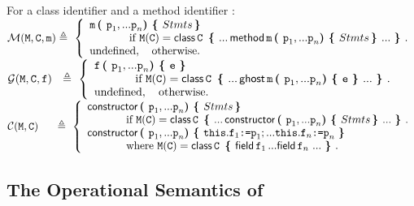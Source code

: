  \begin{definition}[Lookup] For a class identifier   and a method identifier $:$  $ ~ $ \\
\label{def:lookup}
\noindent
$
{\mathcal M}({\mbox{\tt{\ensuremath{{\mbox{\tt{M}}}}}}}{},{\mbox{\tt{{\mbox{\tt{C}}}}}}, {\mbox{\tt{m}}})       \triangleq  \ \left\{
\begin{array}{l}
                        {\mbox{\tt{m}}}\, {\mbox{\tt{\mbox{\tt{\bf{( }}}}}} {\mbox{\tt{p}}}_1, ... {\mbox{\tt{p}}}_n {\mbox{\tt{\mbox{\tt{\bf{) }}}}}} {\mbox{\tt{\mbox{\tt{\bf{\{ }}}}}} Stmts\, {\mbox{\tt{\mbox{\tt{\bf{\} }}}}}}\\
\hspace{0.5in} \mbox{if}\  {\mbox{\tt{\ensuremath{{\mbox{\tt{M}}}}}}}({\mbox{\tt{C}}}) =   {\bf{\sf {class}}}\, {\mbox{\tt{C}}}\, \  {\mbox{\tt{\mbox{\tt{\bf{\{ }}}}}} ...\,   {\bf{\sf {method}}}\, {\mbox{\tt{m}}}\, {\mbox{\tt{\mbox{\tt{\bf{( }}}}}} {\mbox{\tt{p}}}_1, ... {\mbox{\tt{p}}}_n {\mbox{\tt{\mbox{\tt{\bf{) }}}}}} {\mbox{\tt{\mbox{\tt{\bf{\{ }}}}}} Stmts\,  {\mbox{\tt{\mbox{\tt{\bf{\} }}}}}}  ... \ {\mbox{\tt{\mbox{\tt{\bf{\} }}}}}}.
\\
\mbox{undefined},  \ \ \ \mbox{otherwise.}
\end{array}
                    \right.$
\\
$
{\mathcal G} (\M, {\prg{C}}, {\f})    \ \   \triangleq  \ \left\{
\begin{array}{l}
                        \f\, \lp \p_1, ... \p_n \rp \lb \prg{e}\  \rb\\
\hspace{0.5in} \mbox{if}\  \M(\prg{C}) =   \kwN{class}\, \prg{C}\, \  \lb ...\,   \kwN{ghost}\,  \m\, \lp \p_1, ... \p_n \rp \lb \prg{e} \  \rb  ... \ \rb.
\\
\mbox{undefined},  \ \ \ \mbox{otherwise.}
\end{array}
                    \right.$
\\
$
{\mathcal C} (\M, {\prg{C}})   \quad \ \,   \triangleq  \ \left\{
\begin{array}{l}
                        \kwN{constructor} \, \lp \p_1, ... \p_n \rp \lb Stmts\, \rb\\
\hspace{0.5in} \mbox{if}\  \M(\prg{C}) =   \kwN{class}\, \prg{C}\, \  \lb ... \, \kwN{constructor} \, \lp \p_1, ... \p_n \rp \lb Stmts\, \rb ... \ \rb.
\\
\kwN{constructor} \, \lp \p_1, ... \p_n \rp \lb \prg{this}.\f_1 \kw{:=} \p_1; ... \prg{this}.\f_n \kw{:=} \p_n\ \rb\\
\hspace{0.5in} \mbox{where}\  \M(\prg{C}) =   \kwN{class}\, \prg{C}\, \  \lb \kwN{field}\, \f_1\, ... \kwN{field}\, \f_n\ ... \ \rb.
\end{array}
                    \right.$
  \end{definition}

\subsection{The Operational Semantics of \LangOO}
\label{formal:semantics}

